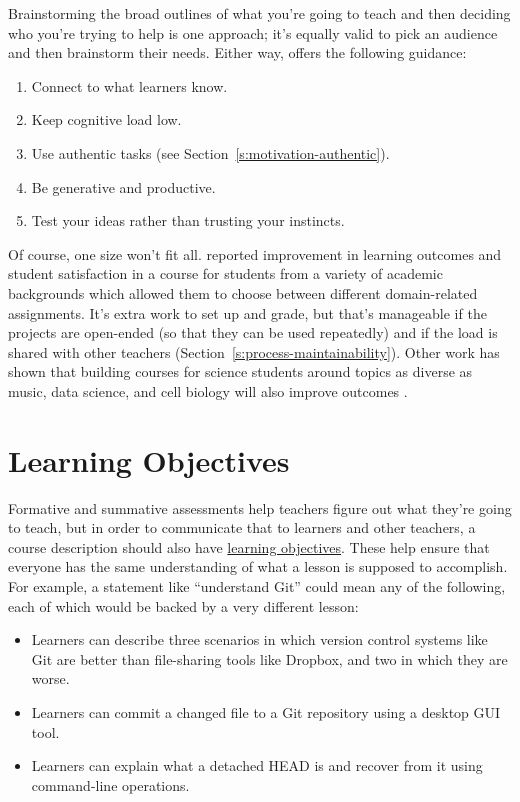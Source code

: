 Brainstorming the broad outlines of what you're going to teach and
then deciding who you're trying to help is one approach; it's equally
valid to pick an audience and then brainstorm their needs. Either way,
\cite{Guzd2016} offers the following guidance:

\begin{enumerate}
\item
  Connect to what learners know.
\item
  Keep cognitive load low.
\item
  Use authentic tasks (see Section~\ref{s:motivation-authentic}).
\item
  Be generative and productive.
\item
  Test your ideas rather than trusting your instincts.
\end{enumerate}

Of course, one size won't fit all. \cite{Alha2018} reported
improvement in learning outcomes and student satisfaction in a course
for students from a variety of academic backgrounds which allowed them
to choose between different domain-related assignments. It's extra
work to set up and grade, but that's manageable if the projects are
open-ended (so that they can be used repeatedly) and if the load is
shared with other teachers (Section~\ref{s:process-maintainability}).
Other work has shown that building courses for science students around
topics as diverse as music, data science, and cell biology will also
improve outcomes
\cite{Pete2017,Dahl2018,Ritz2018}.

\section{Learning Objectives}\label{s:process-objectives}

Formative and summative assessments help teachers figure out what
they're going to teach, but in order to communicate that to learners
and other teachers, a course description should also have \protect\hyperlink{g:learning-objective}{learning
objectives}. These help ensure that
everyone has the same understanding of what a lesson is supposed to
accomplish. For example, a statement like ``understand Git'' could mean
any of the following, each of which would be backed by a very
different lesson:

\begin{itemize}
\item
  Learners can describe three scenarios in which version control
  systems like Git are better than file-sharing tools like Dropbox,
  and two in which they are worse.
\item
  Learners can commit a changed file to a Git repository using a
  desktop GUI tool.
\item
  Learners can explain what a detached HEAD is and recover from it
  using command-line operations.
\end{itemize}

